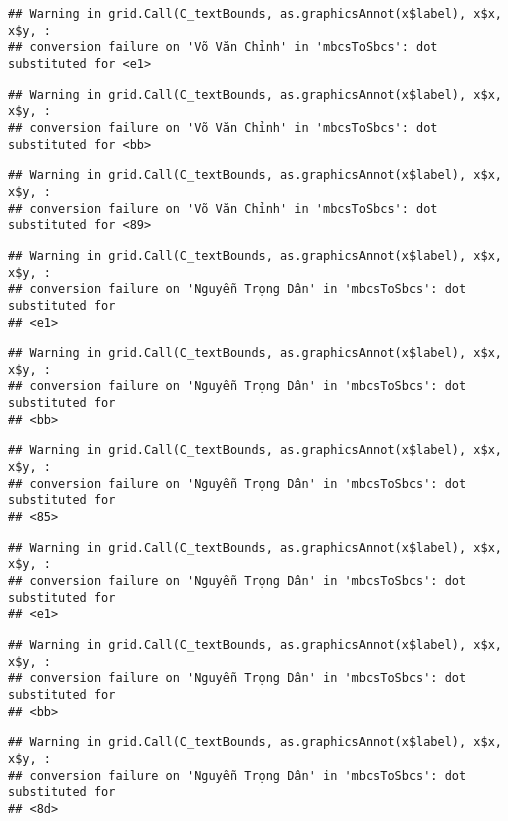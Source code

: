 \documentclass[
]{article}
\begin{document}
\begin{verbatim}
## Warning in grid.Call(C_textBounds, as.graphicsAnnot(x$label), x$x, x$y, :
## conversion failure on 'Võ Văn Chỉnh' in 'mbcsToSbcs': dot substituted for <e1>
\end{verbatim}

\begin{verbatim}
## Warning in grid.Call(C_textBounds, as.graphicsAnnot(x$label), x$x, x$y, :
## conversion failure on 'Võ Văn Chỉnh' in 'mbcsToSbcs': dot substituted for <bb>
\end{verbatim}

\begin{verbatim}
## Warning in grid.Call(C_textBounds, as.graphicsAnnot(x$label), x$x, x$y, :
## conversion failure on 'Võ Văn Chỉnh' in 'mbcsToSbcs': dot substituted for <89>
\end{verbatim}

\begin{verbatim}
## Warning in grid.Call(C_textBounds, as.graphicsAnnot(x$label), x$x, x$y, :
## conversion failure on 'Nguyễn Trọng Dân' in 'mbcsToSbcs': dot substituted for
## <e1>
\end{verbatim}

\begin{verbatim}
## Warning in grid.Call(C_textBounds, as.graphicsAnnot(x$label), x$x, x$y, :
## conversion failure on 'Nguyễn Trọng Dân' in 'mbcsToSbcs': dot substituted for
## <bb>
\end{verbatim}

\begin{verbatim}
## Warning in grid.Call(C_textBounds, as.graphicsAnnot(x$label), x$x, x$y, :
## conversion failure on 'Nguyễn Trọng Dân' in 'mbcsToSbcs': dot substituted for
## <85>
\end{verbatim}

\begin{verbatim}
## Warning in grid.Call(C_textBounds, as.graphicsAnnot(x$label), x$x, x$y, :
## conversion failure on 'Nguyễn Trọng Dân' in 'mbcsToSbcs': dot substituted for
## <e1>
\end{verbatim}

\begin{verbatim}
## Warning in grid.Call(C_textBounds, as.graphicsAnnot(x$label), x$x, x$y, :
## conversion failure on 'Nguyễn Trọng Dân' in 'mbcsToSbcs': dot substituted for
## <bb>
\end{verbatim}

\begin{verbatim}
## Warning in grid.Call(C_textBounds, as.graphicsAnnot(x$label), x$x, x$y, :
## conversion failure on 'Nguyễn Trọng Dân' in 'mbcsToSbcs': dot substituted for
## <8d>
\end{verbatim}
\end{document}
